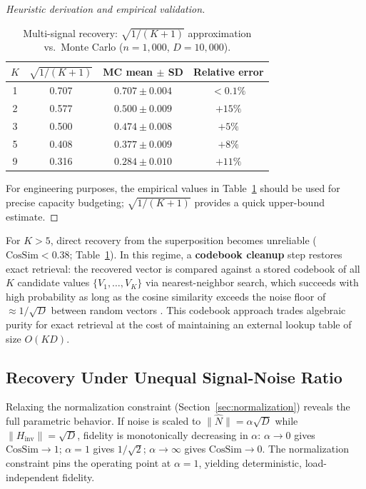 \documentclass[a4paper,11pt]{article}
\begin{document}
\begin{proof}[Heuristic derivation and empirical validation]
\begin{table}[H]
\centering
\caption{Multi-signal recovery: $\sqrt{1/(K+1)}$ approximation vs.\ Monte Carlo ($n = 1{,}000$, $D = 10{,}000$).}
\label{tab:multi_signal_validation}
\begin{tabular}{@{}cccc@{}}
\toprule
$K$ & $\sqrt{1/(K{+}1)}$ & MC mean $\pm$ SD & Relative error \\
\midrule
1 & 0.707 & $0.707 \pm 0.004$ & $<0.1\%$ \\
2 & 0.577 & $0.500 \pm 0.009$ & $+15\%$ \\
3 & 0.500 & $0.474 \pm 0.008$ & $+5\%$ \\
5 & 0.408 & $0.377 \pm 0.009$ & $+8\%$ \\
9 & 0.316 & $0.284 \pm 0.010$ & $+11\%$ \\
\bottomrule
\end{tabular}
\end{table}
For engineering purposes, the empirical values in Table~\ref{tab:multi_signal_validation} should be used for precise capacity budgeting; $\sqrt{1/(K+1)}$ provides a quick upper-bound estimate.
\end{proof}

For $K > 5$, direct recovery from the superposition becomes unreliable ($\text{CosSim} < 0.38$; Table~\ref{tab:multi_signal_validation}). In this regime, a \textbf{codebook cleanup} step restores exact retrieval: the recovered vector is compared against a stored codebook of all $K$ candidate values $\{V_1, \ldots, V_K\}$ via nearest-neighbor search, which succeeds with high probability as long as the cosine similarity exceeds the noise floor of $\approx 1/\sqrt{D}$ between random vectors \cite{kanerva2009, plate1995}. This codebook approach trades algebraic purity for exact retrieval at the cost of maintaining an external lookup table of size $O(KD)$.

\subsection{Recovery Under Unequal Signal-Noise Ratio}
\label{sec:snr}

Relaxing the normalization constraint (Section~\ref{sec:normalization}) reveals the full parametric behavior. If noise is scaled to $\|\hat{N}\| = \alpha\sqrt{D}$ while $\|H_{\text{inv}}\| = \sqrt{D}$, fidelity is monotonically decreasing in $\alpha$: $\alpha \to 0$ gives $\text{CosSim} \to 1$; $\alpha = 1$ gives $1/\sqrt{2}$; $\alpha \to \infty$ gives $\text{CosSim} \to 0$. The normalization constraint pins the operating point at $\alpha = 1$, yielding deterministic, load-independent fidelity.
\end{document}
